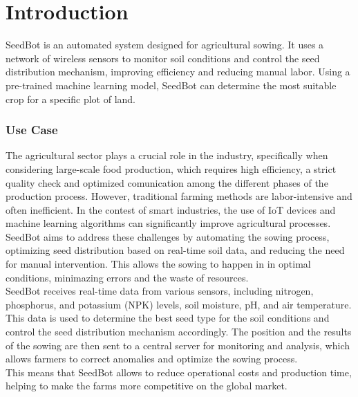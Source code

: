 \chapter{Introduction}

SeedBot is an automated system designed for agricultural sowing. It uses a network of wireless sensors to monitor soil conditions and control the seed distribution mechanism, improving efficiency and reducing manual labor. Using a pre-trained machine learning model, SeedBot can determine the most suitable crop for a specific plot of land.

\subsection{Use Case}
The agricultural sector plays a crucial role in the industry, specifically when considering large-scale food production, which requires high efficiency, a strict quality check and optimized comunication among the different phases of the production process. However, traditional farming methods are labor-intensive and often inefficient. 
In the contest of smart industries, the use of IoT devices and machine learning algorithms can significantly improve agricultural processes.\\


SeedBot aims to address these challenges by automating the sowing process, optimizing seed distribution based on real-time soil data, and reducing the need for manual intervention. This allows the sowing to happen in in optimal conditions, minimazing errors and the waste of resources.\\

SeedBot receives real-time data from various sensors, including nitrogen, phosphorus, and potassium (NPK) levels, soil moisture, pH, and air temperature. This data is used to determine the best seed type for the soil conditions and control the seed distribution mechanism accordingly. The position and the results of the sowing are then sent to a central server for monitoring and analysis, which allows farmers to correct anomalies and optimize the sowing process.\\

This means that SeedBot allows to reduce operational costs and production time, helping to make the farms more competitive on the global market.